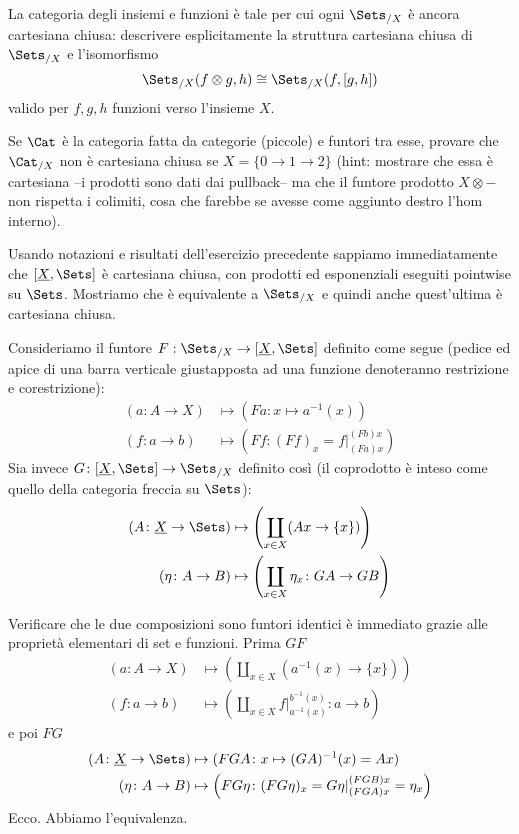 \begin{MyExercise} La categoria degli insiemi e funzioni \`e tale per cui ogni $\Sets_{/X}$ \`e ancora cartesiana chiusa: descrivere esplicitamente la struttura cartesiana chiusa di $\Sets_{/X}$ e l'isomorfismo
\[
\Sets_{/X}(f\otimes g, h)\cong \Sets_{/X}(f, [g,h])
\]
valido per $f,g,h$ funzioni verso l'insieme $X$.

Se $\Cat$ \`e la categoria fatta da categorie (piccole) e funtori tra esse, provare che $\Cat_{/X}$ non \`e cartesiana chiusa se $X=\{0\to 1\to 2\}$ (hint: mostrare che essa è cartesiana --i prodotti sono dati dai pullback-- ma che il funtore prodotto $X\otimes-$ non rispetta i colimiti, cosa che farebbe se avesse come aggiunto destro l'hom interno).
\end{MyExercise}

Usando notazioni e risultati dell'esercizio precedente sappiamo immediatamente che $[\underline{X},\Sets]$ è cartesiana chiusa, con prodotti ed esponenziali eseguiti pointwise su $\Sets$. Mostriamo che è equivalente a $\Sets_{/X}$ e quindi anche quest'ultima è cartesiana chiusa.

Consideriamo il funtore $F:\Sets_{/X}\to[\underline{X},\Sets]$ definito come segue (pedice ed apice di una barra verticale giustapposta ad una funzione denoteranno restrizione e corestrizione):
\[\begin{aligned}
(a\colon A\to X) &\mapsto (Fa\colon x\mapsto a^{-1}(x)) \\
(f\colon a\to b) &\mapsto \left(Ff\colon (Ff)_x=f\vert_{(Fa)x}^{(Fb)x}\right)
\end{aligned}\]
Sia invece $G\colon[\underline{X},\Sets]\to\Sets_{/X}$ definito così (il coprodotto è inteso come quello della categoria freccia su $\Sets$):
\[\begin{aligned}
(A\colon \underline{X}\to\Sets) &\mapsto \left(\coprod_{x\in X}(Ax\to \{x\})\right)\\
(\eta\colon A\to B) &\mapsto \left(\coprod_{x\in X}\eta_x\colon GA\to GB\right)
\end{aligned}\]

Verificare che le due composizioni sono funtori identici è immediato grazie alle proprietà elementari di set e funzioni. Prima $GF$
\[\begin{aligned}
(a\colon A\to X) &\mapsto \left(\coprod_{x\in X}(a^{-1}(x)\to \{x\})\right)\\
(f\colon a\to b) &\mapsto \left(\coprod_{x\in X}f\vert_{a^{-1}(x)}^{b^{-1}(x)}\colon a\to b\right)
\end{aligned}\]
e poi $FG$
\[\begin{aligned}
(A\colon \underline{X}\to\Sets) &\mapsto (FGA\colon x\mapsto (GA)^{-1}(x) = Ax) \\
(\eta\colon A\to B) &\mapsto \left(FG\eta\colon (FG\eta)_x=G\eta\vert_{(FGA)x}^{(FGB)x}=\eta_x\right)
\end{aligned}\]
Ecco. Abbiamo l'equivalenza.

